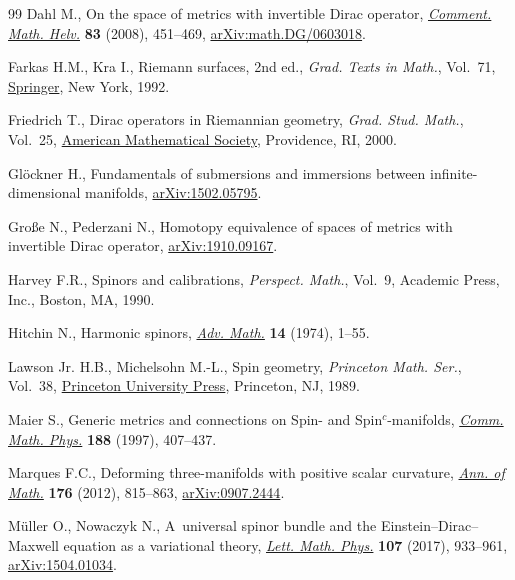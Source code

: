 \documentclass[pdftex]{sigma}
\newcommand\<{\langle}
\renewcommand\>{\rangle}
\theoremstyle{definition}
\newcommand\={\,=\,}
\numberwithin{equation}{section}
\begin{document}
\begin{thebibliography}{99}
Dahl M., On the space of metrics with invertible {D}irac operator,
 \href{https://doi.org/10.4171/CMH/132}{\textit{Comment. Math. Helv.}}
 \textbf{83} (2008), 451--469,
 \href{http://arxiv.org/abs/math.DG/0603018}{arXiv:math.DG/0603018}.

Farkas H.M., Kra I., Riemann surfaces, 2nd ed., \textit{Grad. Texts in Math.}, Vol.~71,
 \href{https://doi.org/10.1007/978-1-4612-2034-3}{Springer}, New
 York, 1992.

Friedrich T., Dirac operators in {R}iemannian geometry, \textit{Grad. Stud.
 Math.}, Vol.~25, \href{https://doi.org/10.1090/gsm/025}{American Mathematical
 Society}, Providence, RI, 2000.

Gl\"ockner H., Fundamentals of submersions and immersions between
 infinite-dimensional manifolds,
 \href{http://arxiv.org/abs/1502.05795}{arXiv:1502.05795}.

Gro{\ss}e N., Pederzani N., Homotopy equivalence of spaces of metrics with
 invertible {D}irac operator,
 \href{http://arxiv.org/abs/1910.09167}{arXiv:1910.09167}.

Harvey F.R., Spinors and calibrations, \textit{Perspect. Math.}, Vol.~9,
 Academic Press, Inc., Boston, MA, 1990.

Hitchin N., Harmonic spinors,
 \href{https://doi.org/10.1016/0001-8708(74)90021-8}{\textit{Adv. Math.}}
 \textbf{14} (1974), 1--55.

Lawson Jr. H.B., Michelsohn M.-L., Spin geometry, \textit{Princeton Math. Ser.},
 Vol.~38, \href{https://doi.org/10.1515/9781400883912}{Princeton University
 Press}, Princeton, NJ, 1989.

Maier S., Generic metrics and connections on {S}pin- and
 {S}pin{$^c$}-manifolds,
 \href{https://doi.org/10.1007/s002200050171}{\textit{Comm. Math. Phys.}}
 \textbf{188} (1997), 407--437.

Marques F.C., Deforming three-manifolds with positive scalar curvature,
 \href{https://doi.org/10.4007/annals.2012.176.2.3}{\textit{Ann. of Math.}}
 \textbf{176} (2012), 815--863,
 \href{http://arxiv.org/abs/0907.2444}{arXiv:0907.2444}.

M\"uller O., Nowaczyk N., A~universal spinor bundle and the
 {E}instein--{D}irac--{M}axwell equation as a variational theory,
 \href{https://doi.org/10.1007/s11005-016-0929-4}{\textit{Lett. Math. Phys.}}
 \textbf{107} (2017), 933--961,
 \href{http://arxiv.org/abs/1504.01034}{arXiv:1504.01034}.


\end{thebibliography}
\end{document}
